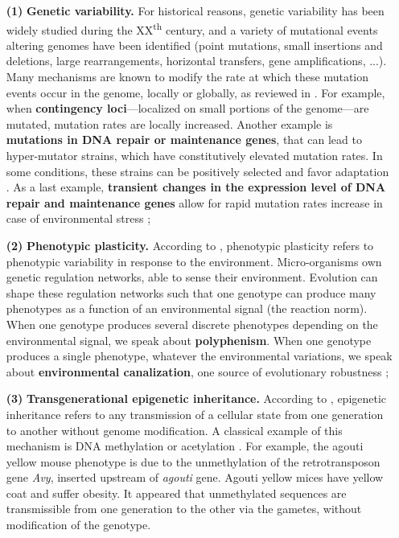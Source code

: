 \begin{enumerate}
\item[\textbf{(1)}] \textbf{Genetic variability.}  For historical reasons, genetic variability has been widely studied during the XX\textsuperscript{th} century, and a variety of mutational events altering genomes have been identified (point mutations, small insertions and deletions, large rearrangements, horizontal transfers, gene amplifications, ...). Many mechanisms are known to modify the rate at which these mutation events occur in the genome, locally or globally, as reviewed in \cite{ryall-et-al-2012}. For example, when \textbf{contingency loci}---localized on small portions of the genome---are mutated, mutation rates are locally increased. Another example is \textbf{mutations in DNA repair or maintenance genes}, that can lead to hyper-mutator strains, which have constitutively elevated mutation rates. In some conditions, these strains can be positively selected and favor adaptation \citep{tenaillon-et-al-1999,denamur-matic-2006}. As a last example, \textbf{transient changes in the expression level of DNA repair and maintenance genes} allow for rapid mutation rates increase in case of environmental stress \citep{foster-2007};
\item[\textbf{(2)}] \textbf{Phenotypic plasticity.}
According to \cite{stearns-1989}, phenotypic plasticity refers to phenotypic variability in response to the environment. Micro-organisms own genetic regulation networks, able to sense their environment. Evolution can shape these regulation networks such that one genotype can produce many phenotypes as a function of an environmental signal (the reaction norm). When one genotype produces several discrete phenotypes depending on the environmental signal, we speak about \textbf{polyphenism}. When one genotype produces a single phenotype, whatever the environmental variations, we speak about \textbf{environmental canalization}, one source of evolutionary robustness \citep{waddington-1942};
\item[\textbf{(3)}] \textbf{Transgenerational epigenetic inheritance.}
According to \cite{veening-et-al-2008}, epigenetic inheritance refers to any transmission of a cellular state from one generation to another without genome modification. A classical example of this mechanism is DNA methylation or acetylation \citep{avery-2006}.
For example, the agouti yellow mouse phenotype is due to the unmethylation of the retrotransposon gene \textit{Avy}, inserted upstream of \textit{agouti} gene. Agouti yellow mices have yellow coat and suffer obesity. It appeared that unmethylated sequences are transmissible from one generation to the other via the gametes, without modification of the genotype.

\end{enumerate}
